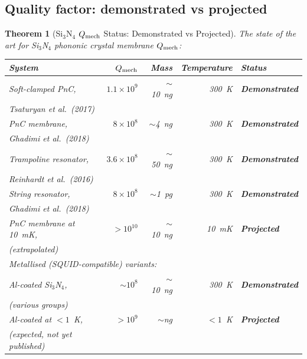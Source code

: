 \documentclass[11pt]{article}
\newtheorem{theorem}{Theorem}[section]
\theoremstyle{definition}
\theoremstyle{remark}
\newcommand{\ee}[1]{\times 10^{#1}}
\newcommand{\Qmech}{Q_{\rm mech}}
\begin{document}
\subsection{Quality factor: demonstrated vs projected}
\label{sec:q_status}

\begin{theorem}[Si$_3$N$_4$ $\Qmech$ Status: Demonstrated vs Projected]
\label{thm:q_status}
The state of the art for Si$_3$N$_4$ phononic crystal membrane $\Qmech$:

\begin{center}
\renewcommand{\arraystretch}{1.3}
\begin{tabular}{p{3.5cm}rrrl}
\toprule
System & $\Qmech$ & Mass & Temperature & Status \\
\midrule
Soft-clamped PnC, & $1.1\ee{9}$ & $\sim$10~ng & 300~K &
  \textbf{Demonstrated} \\
\quad Tsaturyan et al.\ (2017) & & & & \\
PnC membrane, & $8\ee{8}$ & $\sim$4~ng & 300~K &
  \textbf{Demonstrated} \\
\quad Ghadimi et al.\ (2018) & & & & \\
Trampoline resonator, & $3.6\ee{8}$ & $\sim$50~ng & 300~K &
  \textbf{Demonstrated} \\
\quad Reinhardt et al.\ (2016) & & & & \\
String resonator, & $8\ee{8}$ & $\sim$1~pg & 300~K &
  \textbf{Demonstrated} \\
\quad Ghadimi et al.\ (2018) & & & & \\
PnC membrane at 10~mK, & $>10^{10}$ & $\sim$10~ng & 10~mK &
  \textbf{Projected} \\
\quad (extrapolated) & & & & \\
\midrule
\multicolumn{5}{l}{\textit{Metallised (SQUID-compatible) variants:}} \\
\midrule
Al-coated Si$_3$N$_4$, & $\sim 10^8$ & $\sim$10~ng & 300~K &
  \textbf{Demonstrated} \\
\quad (various groups) & & & & \\
Al-coated at $<1$~K, & $>10^{9}$ & $\sim$ng & $<1$~K &
  \textbf{Projected} \\
\quad (expected, not yet published) & & & & \\
\bottomrule
\end{tabular}
\end{center}


\end{theorem}
\end{document}

